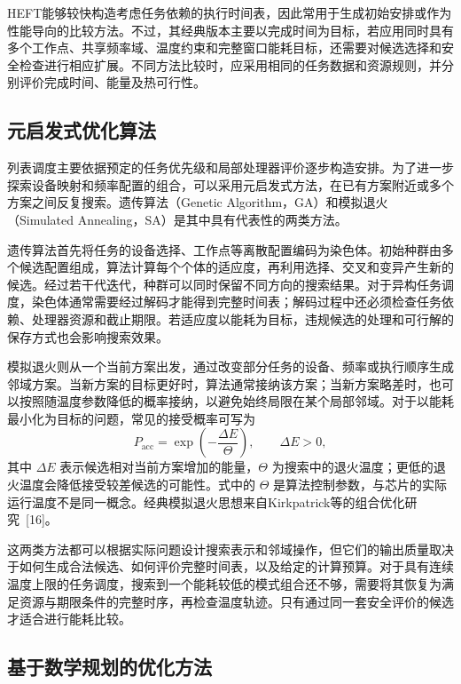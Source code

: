 HEFT能够较快构造考虑任务依赖的执行时间表，因此常用于生成初始安排或作为性能导向的比较方法。不过，其经典版本主要以完成时间为目标，若应用同时具有多个工作点、共享频率域、温度约束和完整窗口能耗目标，还需要对候选选择和安全检查进行相应扩展。不同方法比较时，应采用相同的任务数据和资源规则，并分别评价完成时间、能量及热可行性。

\subsection{元启发式优化算法}

列表调度主要依据预定的任务优先级和局部处理器评价逐步构造安排。为了进一步探索设备映射和频率配置的组合，可以采用元启发式方法，在已有方案附近或多个方案之间反复搜索。遗传算法（Genetic Algorithm，GA）和模拟退火（Simulated Annealing，SA）是其中具有代表性的两类方法。

遗传算法首先将任务的设备选择、工作点等离散配置编码为染色体。初始种群由多个候选配置组成，算法计算每个个体的适应度，再利用选择、交叉和变异产生新的候选。经过若干代迭代，种群可以同时保留不同方向的搜索结果。对于异构任务调度，染色体通常需要经过解码才能得到完整时间表；解码过程中还必须检查任务依赖、处理器资源和截止期限。若适应度以能耗为目标，违规候选的处理和可行解的保存方式也会影响搜索效果。

模拟退火则从一个当前方案出发，通过改变部分任务的设备、频率或执行顺序生成邻域方案。当新方案的目标更好时，算法通常接纳该方案；当新方案略差时，也可以按照随温度参数降低的概率接纳，以避免始终局限在某个局部邻域。对于以能耗最小化为目标的问题，常见的接受概率可写为
\begin{equation}\label{eq:ch2-sa}
 P_{\mathrm{acc}}=\exp\!\left(-\frac{\Delta E}{\Theta}\right),
 \qquad \Delta E>0,
\end{equation}
其中 $\Delta E$ 表示候选相对当前方案增加的能量，$\Theta$ 为搜索中的退火温度；更低的退火温度会降低接受较差候选的可能性。式中的 $\Theta$ 是算法控制参数，与芯片的实际运行温度不是同一概念。经典模拟退火思想来自Kirkpatrick等的组合优化研究~[16]。

这两类方法都可以根据实际问题设计搜索表示和邻域操作，但它们的输出质量取决于如何生成合法候选、如何评价完整时间表，以及给定的计算预算。对于具有连续温度上限的任务调度，搜索到一个能耗较低的模式组合还不够，需要将其恢复为满足资源与期限条件的完整时序，再检查温度轨迹。只有通过同一套安全评价的候选才适合进行能耗比较。

\subsection{基于数学规划的优化方法}

